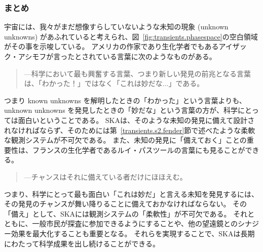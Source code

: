 \subsubsection{まとめ}
宇宙には、我々がまだ想像すらしていないような未知の現象 (unknown unknowns) があふれていると考えられ、図~\ref{fig:transients.phasespace}の空白領域がその事を示唆している。
アメリカの作家であり生化学者でもあるアイザック・アシモフが言ったとされている言葉に次のようなものがある。
\begin{quote}
---科学において最も興奮する言葉、つまり新しい発見の前兆となる言葉は、「わかった！」ではなく「これは妙だな...」である。
\end{quote}
つまり known unknowns を解明したときの「わかった」という言葉よりも、unknown unknowns を発見したときの「妙だな」という言葉の方が、科学にとっては面白いということである。
SKAは、そのような未知の発見に備えて設計されなければならず、そのためには第~\ref{transients.s2.fender}節で述べたような柔軟な観測システムが不可欠である。
また、未知の発見に「備えておく」ことの重要性は、フランスの生化学者であるルイ・パスツールの言葉にも見ることができる。
\begin{quote}
---チャンスはそれに備えている者だけにほほえむ。
\end{quote}
つまり、科学にとって最も面白い「これは妙だ」と言える未知を発見するには、その発見のチャンスが舞い降りることに備えておかなければならない。
その「備え」として、SKAには観測システムの「柔軟性」が不可欠である。
それとともに、一般市民が探査に参加できるようにすることや、他の望遠鏡とのシナジー効果を最大化することも重要となる。
それらを実現することで、SKAは長期にわたって科学成果を出し続けることができる。
